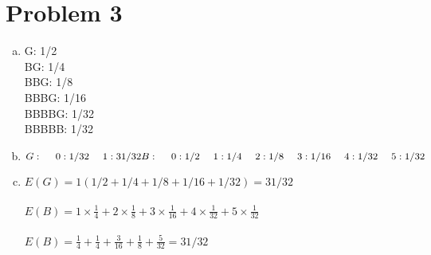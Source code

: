 \documentclass[11pt,letterpaper]{article}
\begin{document}
\section*{Problem 3}
\begin{enumerate}[(a)]
\item
G: 		1/2\\
BG: 	1/4\\
BBG: 	1/8\\
BBBG: 	1/16\\
BBBBG: 	1/32\\
BBBBB: 	1/32\\
\item
$
G:\\
~~~~0: 1/32\\
~~~~1: 31/32\\
B:\\
~~~~0: 1/2\\
~~~~1: 1/4\\
~~~~2: 1/8\\
~~~~3: 1/16\\
~~~~4: 1/32\\
~~~~5: 1/32\\
$
\item
$E(G) = 1(1/2+ 1/4 + 1/8 + 1/16 + 1/32) = 31/32$\\\\
$E(B) = 1\times \frac{1}{4} + 2\times\frac{1}{8}+ 3\times\frac{1}{16}+ 4\times\frac{1}{32} + 5\times \frac{1}{32}$\\\\
$E(B) = \frac{1}{4} + \frac{1}{4}+ \frac{3}{16}+ \frac{1}{8} + \frac{5}{32} = 31/32$\\

\end{enumerate}
\clearpage
\end{document}

